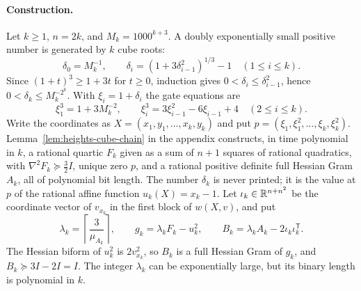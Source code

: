 \paragraph{Construction.}
Let $k\ge1$, $n=2k$, and $M_k=1000^{k+3}$. A doubly exponentially small
positive number is generated by $k$ cube roots:
\begin{equation}
 \delta_0=M_k^{-1},\qquad
 \delta_i=(1+3\delta_{i-1}^2)^{1/3}-1\quad(1\le i\le k).
 \label{eq:heights-tiny-chain}
\end{equation}
Since $(1+t)^3\ge1+3t$ for $t\ge0$, induction gives
$0<\delta_i\le\delta_{i-1}^2$, hence $0<\delta_k\le M_k^{-2^k}$. With
$\xi_i=1+\delta_i$ the gate equations are
\begin{equation}
 \xi_1^3=1+3M_k^{-2},\qquad
 \xi_i^3=3\xi_{i-1}^2-6\xi_{i-1}+4\quad(2\le i\le k).
 \label{eq:heights-cube-gates}
\end{equation}
Write the coordinates as $X=(x_1,y_1,\ldots,x_k,y_k)$ and put
$p=(\xi_1,\xi_1^2,\ldots,\xi_k,\xi_k^2)$. Lemma~\ref{lem:heights-cube-chain}
in the appendix constructs, in time polynomial in $k$, a rational quartic
$F_k$ given as a sum of $n+1$ squares of rational quadratics, with
$\nabla^2F_k\succeq\frac32I$, unique zero $p$, and a rational positive
definite full Hessian Gram $A_k$, all of polynomial bit length. The number
$\delta_k$ is never printed; it is the value at $p$ of the rational affine
function $u_k(X)=x_k-1$. Let $\iota_k\in\mathbb R^{n+n^2}$ be the coordinate vector
of $v_{x_k}$ in the first block of $w(X,v)$, and put
\begin{equation}
 \lambda_k=\left\lceil\frac3{\mu_{A_k}}\right\rceil,\qquad
 g_k=\lambda_kF_k-u_k^2,\qquad
 B_k=\lambda_kA_k-2\iota_k\iota_k^{\mathsf T}.
 \label{eq:heights-witness-family}
\end{equation}
The Hessian biform of $u_k^2$ is $2v_{x_k}^2$, so $B_k$ is a full Hessian Gram
of $g_k$, and $B_k\succeq3I-2I=I$. The integer $\lambda_k$ can be
exponentially large, but its binary length is polynomial in $k$.

